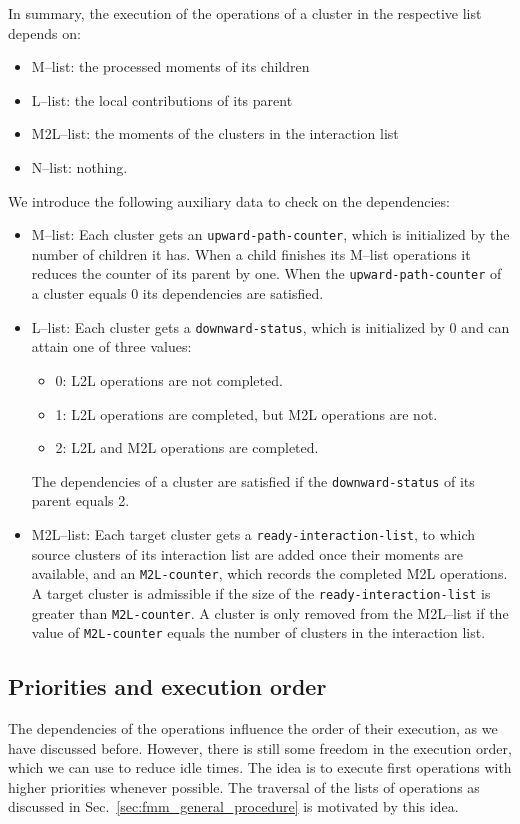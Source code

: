 \documentclass[a4paper,11pt]{article}
\theoremstyle{plain}
\theoremstyle{definition}
\theoremstyle{remark}
\begin{document}
In summary, the execution of the operations of a cluster in the respective list depends on:
\begin{itemize}
  \item M--list: the processed moments of its children
  \item L--list: the local contributions of its parent
  \item M2L--list: the moments of the clusters in the interaction list
  \item N--list: nothing.
\end{itemize}
We introduce the following auxiliary data to check on the dependencies:
\begin{itemize}
  \item M--list: Each cluster gets an \texttt{upward-path-counter}, which is initialized by the number of children it has. When a child finishes its M--list operations it reduces the counter of its parent by one. When the \texttt{upward-path-counter} of a cluster equals 0 its dependencies are satisfied.
  \item L--list: Each cluster gets a \texttt{downward-status}, which is initialized by 0 and can attain one of three values:
  \begin{itemize}
    \item 0:  L2L operations are not completed.
    \item 1:  L2L operations are completed, but M2L operations are not.
    \item 2:  L2L and M2L operations are completed.
  \end{itemize}
  The dependencies of a cluster are satisfied if the \texttt{downward-status} of its parent equals 2.
  \item M2L--list: Each target cluster gets a \texttt{ready-interaction-list}, to which source clusters of its interaction list are added once their moments are available, and an \texttt{M2L-counter}, which records the completed M2L operations. A target cluster is admissible if the size of the \texttt{ready-interaction-list} is greater than \texttt{M2L-counter}. A cluster is only removed from the M2L--list if the value of \texttt{M2L-counter} equals the number of clusters in the interaction list.
\end{itemize}

\subsection{Priorities and execution order}
The dependencies of the operations influence the order of their execution, as we have discussed before. However, there is still some freedom in the execution order, which we can use to reduce idle times. The idea is to execute first operations with higher priorities whenever possible. The traversal of the lists of operations as discussed in Sec.~\ref{sec:fmm_general_procedure} is motivated by this idea.
\end{document}

